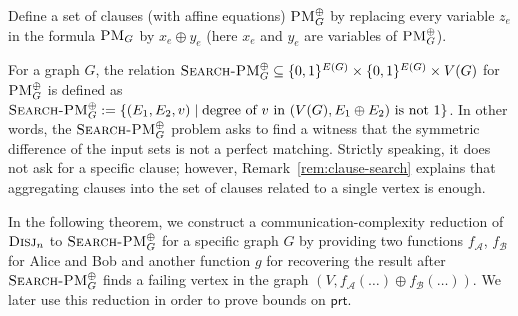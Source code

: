 \documentclass[11pt]{article}
\newcommand{\scterm}[1]{{\textrm{\sc #1}}}
\newcommand{\prt}{\mathsf{prt}}
\newcommand{\disj}{\scterm{Disj}}
\newcommand{\PM}{\scterm{PM}}
\newcommand{\xorPM}{\textsc{Search-PM}^\oplus}
\newcommand{\Alice}{\mathcal{A}}
\newcommand{\Bob}{\mathcal{B}}
\numberwithin{equation}{section}
\begin{document}
Define a set of clauses (with affine equations) 
$\PM^\oplus_G$ by replacing every variable $z_e$ in the formula $\PM_G$
by $x_e\oplus y_e$ (here $x_e$ and $y_e$ are variables of $\PM^\oplus_G$).

For a graph $G$, the relation 
 $\xorPM_G \subseteq \{0,1\}^{E(G)} \times \{0,1\}^{E(G)} \times V(G)$ 
for $\PM^\oplus_G$ is defined as
 $\xorPM_G := \{(E_1, E_2, v) \mid \text{degree of } v \text{ in } (V(G), E_1 \oplus E_2) \text{ is not } 1\}$. In other words, the $\xorPM_G$ problem asks to find a witness that the symmetric difference of the input sets is not a perfect matching. Strictly speaking, it does not ask for a specific clause; however, Remark~\ref{rem:clause-search} explains that aggregating clauses into the set of clauses related to a single vertex is enough.

In the following theorem, we construct a communication-complexity reduction of $\disj_n$ to $\xorPM_G$ for a specific graph $G$ by providing two functions $f_{\Alice}$, $f_{\Bob}$ for Alice and Bob and another function $g$ for recovering the result after $\xorPM_G$ finds a failing vertex in the graph $(V,f_{\Alice}(\ldots)\oplus f_{\Bob}(\ldots))$. We later use this reduction in order to prove bounds on $\prt$.
\end{document}
